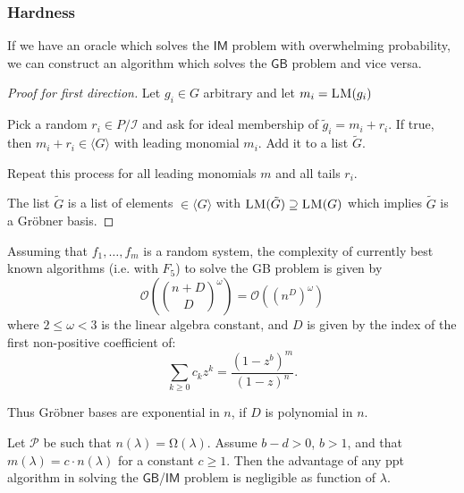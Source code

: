 \documentclass[10pt]{beamer}
\newcommand{\ideal}[1]{\langle {#1} \rangle}
\newcommand{\LM}[1]{\ensuremath{\textsc{LM}(#1)\xspace}}
\newcommand{\ord}[1]{\ensuremath{\mathcal{O}\!\left(#1\right)}}
\newcommand{\sys}{\ensuremath{f_1,\dots,f_m}\xspace}
\newcommand{\secpar}{\lambda}
\newcommand{\GB}{\ensuremath{\mathsf{GB}}\xspace}
\newcommand{\IM}{\ensuremath{\mathsf{IM}}\xspace}
\newcommand{\I}{\ensuremath{\mathcal{I}}\xspace}
\begin{document}
\begin{frame}[allowframebreaks]
\frametitle{Hardness}
\begin{lemma}[IM $<=>$ GB]
\label{lem:IR=GB} 
If we have an oracle which solves the \IM problem with overwhelming probability, we can construct an algorithm which solves the \GB problem and vice versa.
\end{lemma}

\begin{proof}[Proof for first direction]
Let $g_i \in G$ arbitrary and let $m_i = \LM{g_i}$ 

\vspace{0.5em}

Pick a random $r_i \in P/\I$ and ask for ideal membership of $\tilde{g}_i = m_i + r_i$. If true, then $m_i + r_i \in \ideal{G}$ with leading monomial $m_i$. Add it to a list $\tilde{G}$.

\vspace{0.5em}

Repeat this process for all leading monomials $m$ and all tails $r_i$. 

\vspace{0.5em}

The list $\tilde{G}$ is a list of elements $\in \ideal{G}$ with $\LM{\tilde{G}} \supseteq \LM{G}$ which implies $\tilde{G}$ is a Gröbner basis.
\end{proof}

\framebreak

Assuming that $\sys$ is a random system, the complexity of currently best known algorithms (i.e.  with $F_5$) to solve the GB problem is given by
\[
 \ord{ { {{n + D} \choose D}}^\omega } = \ord{ (n^D)^\omega}
\]
where $2 \leq \omega < 3$ is the linear algebra constant, and $D$ is given by the index of the first non-positive coefficient of:
\[
 \sum_{k\geq 0} c_k z^k = \frac{(1-z^{b})^{m}}{(1-z)^{n}}.
\]

Thus Gröbner bases are exponential in $n$, if $D$ is polynomial in $n$.

\framebreak

\begin{definition}[\GB/\IM Assumption]
\label{def.GB.assump}
Let $\mathcal{P}$ be such that $n(\secpar)=\mathrm{\Omega}(\secpar)$. Assume $b-d >0$, $b>1$, and that $m(\secpar) = c\cdot n(\secpar)$ for a constant $c \ge 1$. Then the advantage of any ppt algorithm in solving  the \GB/\IM problem is negligible as function of $\secpar$. 
\end{definition}
\end{frame}
\end{document}
